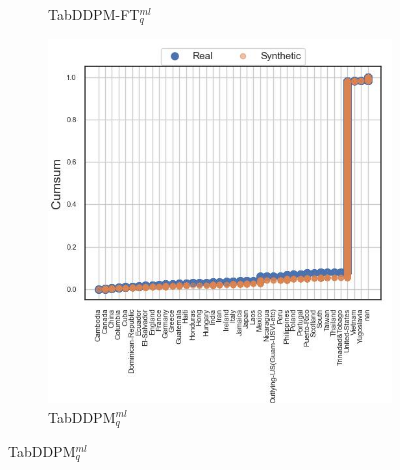 \begin{figure}[H]
\begin{subfigure}{0.32\textwidth}
		\caption{TabDDPM-FT$^{ml}_q$}
	\end{subfigure}
	\begin{subfigure}{0.32\textwidth}
		\centering
		\includegraphics[width=\textwidth]{images/cdf/tab-ddpm.jpg}
		\caption{TabDDPM$^{ml}_q$}
	\end{subfigure}



\end{figure}
